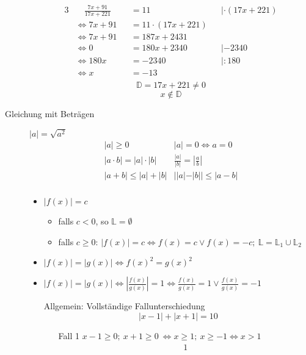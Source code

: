 \documentclass[12pt,a4paper]{article}
\begin{document}
\begin{description}
\begin{alignat*}{3}
			 & \quad \frac{7x+91}{17x+221} &  & = 11                 &  & | \cdot (17x + 221) \\
			 & \Leftrightarrow 7x + 91     &  & = 11 \cdot (17x+221)                          \\
			 & \Leftrightarrow 7x + 91     &  & = 187x + 2431                                 \\
			 & \Leftrightarrow 0           &  & = 180x +2340         &  & |-2340              \\
			 & \Leftrightarrow 180x        &  & = -2340              &  & | :180              \\
			 & \Leftrightarrow x           &  & = -13                                         \\
		\end{alignat*}
		$$\mathbb{D} = 17x+221 \not = 0$$
		$$x \not \in \mathbb{D}$$
	\item[Gleichung mit Beträgen] $|a| = \sqrt{a^2}$
		$$\begin{array}{ll}
				|a| \geq 0                  & |a| = 0 \Leftrightarrow a = 0              \\
				|a \cdot b| = |a| \cdot |b| & \frac{|a|}{|b|} = \left|\frac{a}{b}\right| \\
				|a+b| \leq  |a| + |b|       & ||a|-|b|| \leq |a-b|                       \\
			\end{array}$$
		\begin{itemize}
			\item $|f(x)| = c$ \
			      \begin{itemize}
				      \item falls $c<0$, so $\mathbb{L}= \emptyset$
				      \item falls $c\geq0$: $|f(x)| = c \Leftrightarrow f(x) = c \vee f(x) = -c;\ \mathbb{L} = \mathbb{L}_1 \cup \mathbb{L}_2$
			      \end{itemize}
			\item $|f(x)| = |g(x)| \Leftrightarrow f(x)^2 = g(x)^2$
			\item $|f(x)| = |g(x)| \Leftrightarrow \left|\frac{f(x)}{g(x)}\right| = 1 \Leftrightarrow \frac{f(x)}{g(x)} = 1 \vee \frac{f(x)}{g(x)} = -1$
			\item[Allgemein:] Vollständige Fallunterschiedung
				$$|x-1|+|x+1|=10$$
				\begin{itemize}
					\item[Fall 1] $x-1 \geq 0;\ x+1 \geq 0 \ \Leftrightarrow x \geq 1;\ x\geq -1 \Leftrightarrow x>1$
						\begin{alignat*} {1}

\end{alignat*}
\end{itemize}
\end{itemize}
\end{description}
\end{document}
